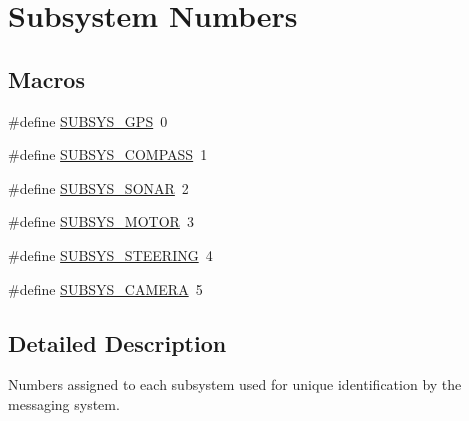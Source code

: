 \hypertarget{group__subsys__nums}{\section{Subsystem Numbers}
\label{group__subsys__nums}
}
\subsection*{Macros}
\begin{DoxyCompactItemize}
\item 
\#define \hyperlink{group__subsys__nums_ga468920c27e6f462f4319229cda832476}{S\-U\-B\-S\-Y\-S\-\_\-\-G\-P\-S}~0
\item 
\#define \hyperlink{group__subsys__nums_ga7476b8f22f1670fcf89da75d9fe3b643}{S\-U\-B\-S\-Y\-S\-\_\-\-C\-O\-M\-P\-A\-S\-S}~1
\item 
\#define \hyperlink{group__subsys__nums_ga3ce4f17430989c1b4d5b0ae9ddb38df8}{S\-U\-B\-S\-Y\-S\-\_\-\-S\-O\-N\-A\-R}~2
\item 
\#define \hyperlink{group__subsys__nums_gaf957c814784b521302308d9de3fe07d1}{S\-U\-B\-S\-Y\-S\-\_\-\-M\-O\-T\-O\-R}~3
\item 
\#define \hyperlink{group__subsys__nums_ga8c00ac0932359e608b0870b1cfa7b7dc}{S\-U\-B\-S\-Y\-S\-\_\-\-S\-T\-E\-E\-R\-I\-N\-G}~4
\item 
\#define \hyperlink{group__subsys__nums_ga7ab9ade0a6a5934eb6ad244e1130929f}{S\-U\-B\-S\-Y\-S\-\_\-\-C\-A\-M\-E\-R\-A}~5
\end{DoxyCompactItemize}


\subsection{Detailed Description}
Numbers assigned to each subsystem used for unique identification by the messaging system. 


